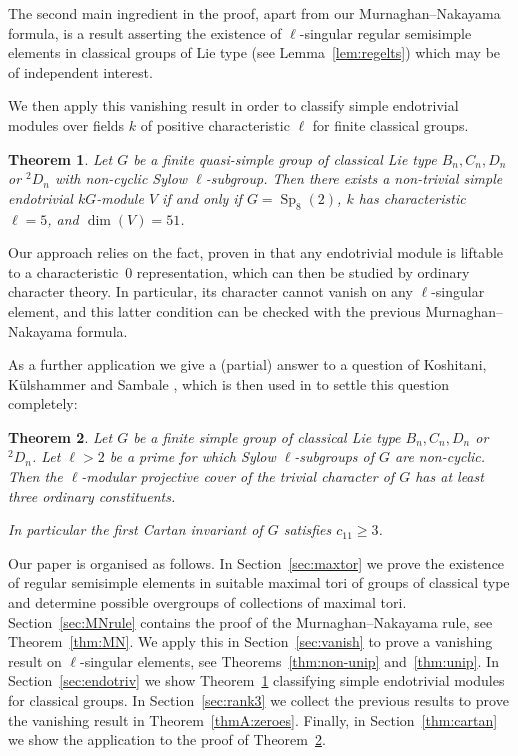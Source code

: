 \documentclass{ert-l}
\newcommand{\Sp}{{\operatorname{Sp}}}
\newcommand{\tw}[1]{{}^#1\!}
\newtheorem{thmA}{Theorem}
\theoremstyle{definition}
\theoremstyle{remark}
\begin{document}
The second main ingredient in the proof, apart from our Murnaghan--Nakayama
formula, is a result asserting the existence of $\ell$-singular regular
semisimple elements in classical groups of Lie type (see
Lemma~\ref{lem:regelts}) which may be of independent interest.
\medskip

We then apply this vanishing result in order to classify simple endotrivial
modules over fields $k$ of positive characteristic $\ell$ for finite classical
groups.

\begin{thmA}   \label{thmA:endoclass}
 Let $G$ be a finite quasi-simple group of classical Lie type $B_n,C_n,D_n$ or
 $\tw2D_n$ with non-cyclic Sylow $\ell$-subgroup. Then there exists a
 non-trivial simple endotrivial $kG$-module $V$ if and only if $G=\Sp_8(2)$,
 $k$ has characteristic~$\ell=5$, and $\dim(V)=51$.
\end{thmA}

Our approach relies on the fact, proven in \cite[Thm.~1.3]{LMS13} that any
endotrivial module is liftable to a characteristic~0 representation, which can
then be studied by ordinary character theory. In particular, its character
cannot vanish on any $\ell$-singular element, and this latter condition can be
checked with the previous Murnaghan--Nakayama formula.
\medskip

As a further application we give a (partial) answer to a question of
Koshitani, K\"uls\-hammer and Sambale \cite{KKS}, which is then used in
\cite{LM15} to settle this question completely:

\begin{thmA}   \label{thmA:PIMs}
 Let $G$ be a finite simple group of classical Lie type $B_n,C_n,D_n$ or
 $\tw2D_n$. Let $\ell>2$ be a prime for which Sylow $\ell$-subgroups of $G$
 are non-cyclic. Then the $\ell$-modular projective cover of the trivial
 character of $G$ has at least three ordinary constituents. \par
 In particular the first Cartan invariant of $G$ satisfies $c_{11}\ge3$.
\end{thmA}

Our paper is organised as follows. In Section~\ref{sec:maxtor} we prove the
existence of regular semisimple elements in suitable maximal tori of
groups of classical type and determine possible overgroups of collections of
maximal tori. Section~\ref{sec:MNrule} contains the proof of the
Murnaghan--Nakayama rule, see Theorem~\ref{thm:MN}. We apply this in
Section~\ref{sec:vanish} to prove a vanishing result on $\ell$-singular
elements, see Theorems~\ref{thm:non-unip} and~\ref{thm:unip}. In
Section~\ref{sec:endotriv} we show Theorem~\ref{thmA:endoclass}
classifying simple endotrivial modules for classical groups. In
Section~\ref{sec:rank3} we collect the previous results to prove the vanishing
result in Theorem~\ref{thmA:zeroes}. Finally, in Section~\ref{thm:cartan} we
show the application to the proof of Theorem~\ref{thmA:PIMs}.
\medskip
\end{document}
